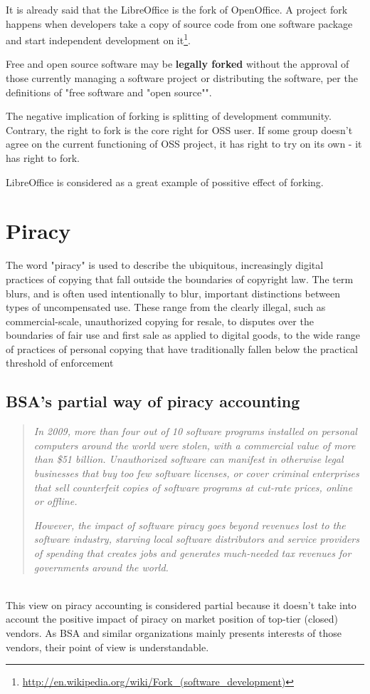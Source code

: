\documentclass[times, utf8, seminar]{fit}
\begin{document}
It is already said that the LibreOffice is the fork of OpenOffice.  A project fork happens when developers take a copy of source code from one software package and start independent development on it\footnote{\url{http://en.wikipedia.org/wiki/Fork_(software_development)}}. 

Free and open source software may be \textbf{legally forked} without the approval of those currently managing a software project or distributing the software, per the definitions of "free software and "open source"". 

The negative implication of forking is splitting of development community. Contrary, the right to fork is the core right for OSS user. If some group doesn't agree on the current functioning of OSS project, it has right to try on its own - it has right to fork.

LibreOffice is considered as a great example of possitive effect of forking.    

\section{Piracy}

The word "piracy" is used to describe the ubiquitous, increasingly digital practices of copying that fall outside the boundaries of copyright law. The term blurs, and is often used intentionally to blur, important distinctions between types of uncompensated use. These range from the clearly illegal, such as commercial-scale, unauthorized copying for resale, to disputes over the boundaries of fair use and first sale as applied to digital goods, to the wide range of practices of personal copying that have traditionally fallen below the practical threshold of enforcement\citep{mediapiracy}

\subsection{BSA's partial way of piracy accounting}

\begin{quotation}
\emph{In 2009, more than four out of 10 software programs installed on personal computers around the world were stolen, with a commercial value of more than \$51 billion. Unauthorized software can manifest in otherwise legal businesses that buy too few software licenses, or cover criminal enterprises that sell counterfeit copies of software programs at cut-rate prices, online or offline.}

\emph{However, the impact of software piracy goes beyond revenues lost to the software industry, starving local software distributors and service providers of spending that creates jobs and generates much-needed tax revenues for governments around the world.}\citep{bsapiracyimpact}
\end{quotation}\\
This view on piracy accounting is considered partial because it doesn't take into account the positive impact of piracy on market position of top-tier (closed) vendors. As BSA and similar organizations mainly presents interests of those vendors, their point of view is understandable.  
\end{document}
